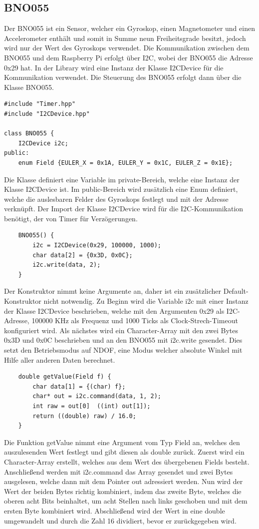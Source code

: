 \documentclass[12pt]{article}
\begin{document}
\subsection{BNO055}
Der BNO055 ist ein Sensor, welcher ein Gyroskop, einen Magnetometer und einen Accelerometer enthält und somit in Summe neun Freiheitsgrade besitzt, jedoch wird nur der Wert des Gyroskops verwendet. Die Kommunikation zwischen dem BNO055 und dem Raspberry Pi erfolgt über I2C, wobei der BNO055 die Adresse 0x29 hat. In der Library wird eine Instanz der Klasse I2CDevice für die Kommunikation verwendet. Die Steuerung des BNO055 erfolgt dann über die Klasse BNO055.\\
\begin{verbatim}
#include "Timer.hpp"
#include "I2CDevice.hpp"

class BNO055 {
    I2CDevice i2c;
public:
    enum Field {EULER_X = 0x1A, EULER_Y = 0x1C, EULER_Z = 0x1E};
\end{verbatim}
Die Klasse definiert eine Variable im private-Bereich, welche eine Instanz der Klasse I2CDevice ist. Im public-Bereich wird zusätzlich eine Enum definiert, welche die auslesbaren Felder des Gyroskops festlegt und mit der Adresse verknüpft. Der Import der Klasse I2CDevice wird für die I2C-Kommunikation benötigt, der von Timer für Verzögerungen.\\
\begin{verbatim}
    BNO055() {
        i2c = I2CDevice(0x29, 100000, 1000);
        char data[2] = {0x3D, 0x0C};
        i2c.write(data, 2);
    }
\end{verbatim}
Der Konstruktor nimmt keine Argumente an, daher ist ein zusätzlicher Default-Konstruktor nicht notwendig. Zu Beginn wird die Variable i2c mit einer Instanz der Klasse I2CDevice beschrieben, welche mit den Argumenten 0x29 als I2C-Adresse, 100000 KHz als Frequenz und 1000 Ticks als Clock-Strech-Timeout konfiguriert wird. Als nächstes wird ein Character-Array mit den zwei Bytes 0x3D und 0x0C beschrieben und an den BNO055 mit i2c.write gesendet. Dies setzt den Betriebsmodus auf NDOF, eine Modus welcher absolute Winkel mit Hilfe aller anderen Daten berechnet.  \\
\begin{verbatim}
    double getValue(Field f) {
        char data[1] = {(char) f};
        char* out = i2c.command(data, 1, 2);
        int raw = out[0]  ((int) out[1]);
        return ((double) raw) / 16.0;
    }
\end{verbatim}
Die Funktion getValue nimmt eine Argument vom Typ Field an, welches den auszulesenden Wert festlegt und gibt diesen als double zurück. Zuerst wird ein Character-Array erstellt, welches aus dem Wert des übergebenen Fields besteht. Anschließend werden mit i2c.command das Array gesendet und zwei Bytes ausgelesen, welche dann mit dem Pointer out adressiert werden. Nun wird der Wert der beiden Bytes richtig kombiniert, indem das zweite Byte, welches die oberen acht Bits beinhaltet, um acht Stellen nach links geschoben und mit dem ersten Byte kombiniert wird. Abschließend wird der Wert in eine double umgewandelt und durch die Zahl 16 dividiert, bevor er zurückgegeben wird.
\end{document}
